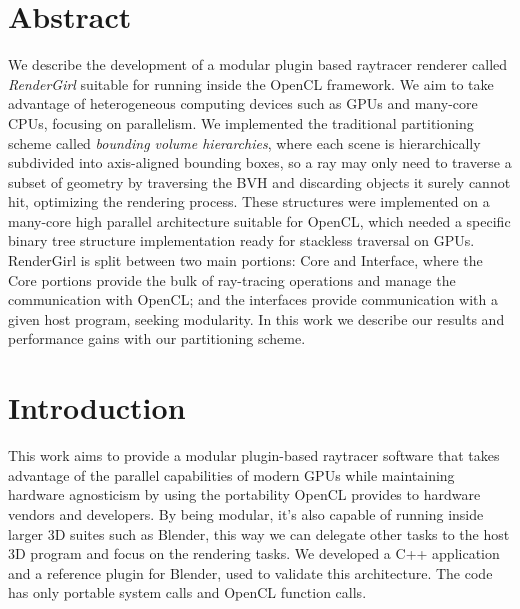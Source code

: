\documentclass[a0,portrait]{a0poster}
\begin{document}
\begin{multicols}{2} %



\color{Navy} %

\section*{Abstract}
\large

We describe the development of a modular plugin based raytracer
renderer called \emph{RenderGirl} suitable for running inside the
OpenCL framework. We aim to take advantage of heterogeneous computing
devices such as GPUs and many-core CPUs, focusing on parallelism. We
implemented the traditional partitioning scheme called \emph{bounding
  volume hierarchies}, where each scene is hierarchically subdivided
into axis-aligned bounding boxes, so a ray may only need to traverse a
subset of geometry by traversing the BVH and discarding objects it
surely cannot hit, optimizing the rendering process. These structures
were implemented on a many-core high parallel architecture suitable
for OpenCL, which needed a specific binary tree structure
implementation ready for stackless traversal on GPUs. RenderGirl is
split between two main portions: Core and Interface, where the Core
portions provide the bulk of ray-tracing operations and manage the
communication with OpenCL; and the interfaces provide communication
with a given host program, seeking modularity. In this work we
describe our results and performance gains with our partitioning
scheme.


\color{Black} %
\large
\section*{Introduction}

This work aims to provide a modular plugin-based raytracer software
that takes advantage of the parallel capabilities of modern GPUs while
maintaining hardware agnosticism by using the portability OpenCL
provides to hardware vendors and developers. By being modular, it's
also capable of running inside larger 3D suites such as Blender, this
way we can delegate other tasks to the host 3D program and focus on
the rendering tasks. We developed a C++ application and a reference
plugin for Blender, used to validate this architecture. The code has
only portable system calls and OpenCL function calls.


\end{multicols}
\end{document}
